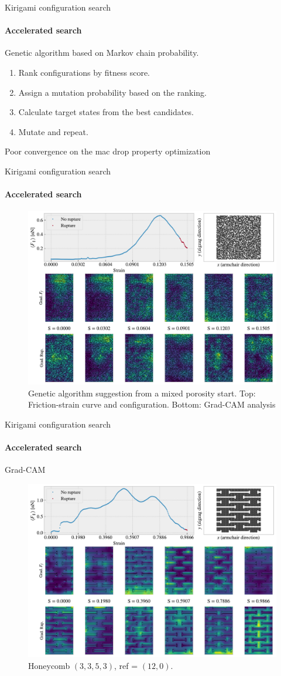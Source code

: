 \documentclass[
	10pt, %
]{beamer}
\begin{document}
%
%
\begin{frame}{Kirigami configuration search}
	\framesubtitle{Accelerated search}
	Genetic algorithm based on Markov chain probability. 
	\begin{enumerate}
		\item Rank configurations by fitness score.
		\item Assign a mutation probability based on the ranking.
		\item Calculate target states from the best candidates.
		\item Mutate and repeat.
	\end{enumerate}
	Poor convergence on the mac drop property optimization
\end{frame}
%
%
\begin{frame}{Kirigami configuration search}
	\framesubtitle{Accelerated search}
	\begin{figure}[H]
		\centering
		\includegraphics[width=0.7\linewidth]{../thesis/figures/search/grad_cam_GA_RN_start_top0.pdf}
		\caption{Genetic algorithm suggestion from a mixed porosity start. Top: Friction-strain curve and configuration. Bottom: Grad-CAM analysis}
	\end{figure}  
\end{frame}
%
%
\begin{frame}{Kirigami configuration search}
	\framesubtitle{Accelerated search}
	Grad-CAM
	\begin{figure}[H]
		\centering
		\includegraphics[width=0.7\linewidth]{../thesis/figures/search/grad_cam_hon_3_3_5_3_12_0.pdf}
		\caption{Honeycomb $(3,3,5,3)$, ref = $(12,0)$.}
	\end{figure}  
\end{frame}
%
%
\end{document}
